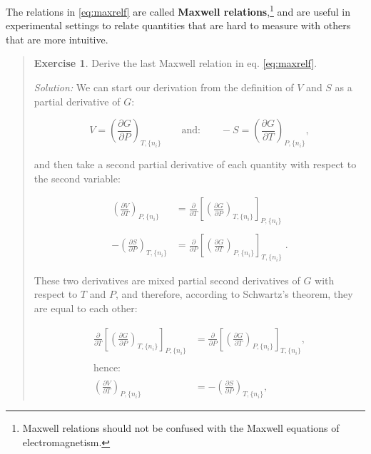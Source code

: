 \documentclass[
  9pt,
]{extbook}
\theoremstyle{definition}
\theoremstyle{definition}
\theoremstyle{definition}
\newtheorem{exercise}{Exercise}[chapter]
\theoremstyle{remark}
\begin{document}
The relations in \eqref{eq:maxrelf} are called \textbf{Maxwell relations},\footnote{Maxwell relations should not be confused with the Maxwell equations of electromagnetism.} and are useful in experimental settings to relate quantities that are hard to measure with others that are more intuitive.

\begin{quote}
\begin{exercise}
\protect\hypertarget{exr:maxwellEx}{}{\label{exr:maxwellEx} }Derive the last Maxwell relation in eq. \eqref{eq:maxrelf}.

\emph{Solution:} We can start our derivation from the definition of \(V\) and \(S\) as a partial derivative of \(G\):

\begin{equation}
 V = \left(\frac{\partial G}{\partial P} \right)_{T,\{n_i\}} \qquad \text{and:} \qquad -S = \left(\frac{\partial G}{\partial T} \right)_{P,\{n_i\}},
\end{equation}

and then take a second partial derivative of each quantity with respect to the second variable:

\begin{equation}
\begin{aligned}
 \left(\frac{\partial V}{\partial T} \right)_{P,\{n_i\}} &=\frac{\partial}{\partial T}\left[ \left(\frac{\partial G}{\partial P} \right)_{T,\{n_i\}} \right]_{P,\{n_i\}} \\
\\
-\left(\frac{\partial S}{\partial P} \right)_{T,\{n_i\}} &=\frac{\partial}{\partial P}\left[ \left(\frac{\partial G}{\partial T} \right)_{P,\{n_i\}} \right]_{T,\{n_i\}} \;.
\end{aligned}
\end{equation}

These two derivatives are mixed partial second derivatives of \(G\) with respect to \(T\) and \(P\), and therefore, according to Schwartz's theorem, they are equal to each other:

\begin{equation}
\begin{aligned}
\frac{\partial}{\partial T}\left[ \left(\frac{\partial G}{\partial P} \right)_{T,\{n_i\}} \right]_{P,\{n_i\}} &=
\frac{\partial}{\partial P}\left[ \left(\frac{\partial G}{\partial T} \right)_{P,\{n_i\}} \right]_{T,\{n_i\}}, \\
\\
\text{hence:} \\
\\
 \left(\frac{\partial V}{\partial T} \right)_{P,\{n_i\}} &= -\left(\frac{\partial S}{\partial P} \right)_{T,\{n_i\}},
\end{aligned}
\end{equation}


\end{exercise}
\end{quote}
\end{document}
